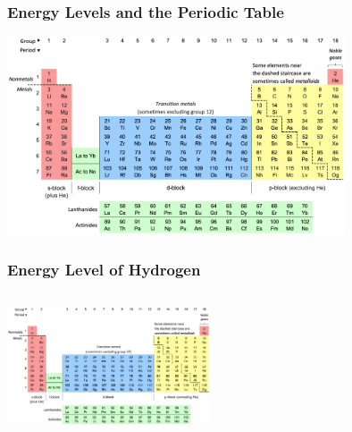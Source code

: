 \documentclass{beamer}
\begin{document}
\begin{frame}
    \frametitle{Energy Levels and the Periodic Table}
    \includegraphics[width=10cm]{../../../../public/images/pTable.png}
\end{frame}

\begin{frame}
    \frametitle{Energy Level of Hydrogen}
    \begin{columns}
        
        \begin{column}{0.5\textwidth}
            \includegraphics[width=6cm]{../../../../public/images/pTable.png}
            
        \end{column}
        \begin{column}{0.5\textwidth}

            
        \end{column}
    \end{columns}

\end{frame}
\end{document}
